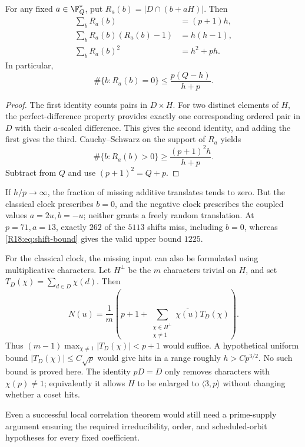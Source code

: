 \documentclass[11pt,a4paper]{article}
\theoremstyle{definition}\newtheorem{definition}[theorem]{Definition}
\theoremstyle{remark}\newtheorem{remark}[theorem]{Remark}
\begin{document}
\begin{proposition}\label{R18:prop:shifts}
For any fixed $a\in\F_Q^*$, put $R_a(b)=|D\cap(b+aH)|$.
Then
\begin{align*}
 \sum_bR_a(b)&=(p+1)h,\\
 \sum_bR_a(b)(R_a(b)-1)&=h(h-1),\\
 \sum_bR_a(b)^2&=h^2+ph.
\end{align*}
In particular,
\begin{equation}\label{R18:eq:shift-bound}
 \#\{b:R_a(b)=0\}\le\frac{p(Q-h)}{h+p}.
\end{equation}
\end{proposition}
\begin{proof}
The first identity counts pairs in $D\times H$.
For two distinct elements of $H$, the perfect-difference property
provides exactly one corresponding ordered pair in $D$ with their
$a$-scaled difference. This gives the second identity, and adding
the first gives the third. Cauchy--Schwarz on the support of $R_a$
yields
\[
 \#\{b:R_a(b)>0\}\ge\frac{(p+1)^2h}{h+p}.
\]
Subtract from $Q$ and use $(p+1)^2=Q+p$.
\end{proof}

If $h/p\to\infty$, the fraction of missing additive translates tends
to zero. But the classical clock prescribes $b=0$, and the negative
clock prescribes the coupled values $a=2u,b=-u$; neither grants a
freely random translation. At $p=71,a=13$, exactly $262$ of the
$5113$ shifts miss, including $b=0$, whereas
\eqref{R18:eq:shift-bound} gives the valid upper bound $1225$.

For the classical clock, the missing input can also be formulated
using multiplicative characters. Let $H^\perp$ be the $m$ characters
trivial on $H$, and set $T_D(\chi)=\sum_{d\in D}\chi(d)$. Then
\[
 N(u)=\frac1m\left(p+1+
 \sum_{\substack{\chi\in H^\perp\\\chi\ne1}}
 \overline{\chi(u)}T_D(\chi)\right).
\]
Thus $(m-1)\max_{\chi\ne1}|T_D(\chi)|<p+1$ would suffice.
A hypothetical uniform bound $|T_D(\chi)|\le C\sqrt p$ would
give hits in a range roughly $h>Cp^{3/2}$. No such bound is
proved here. The identity $pD=D$ only removes characters with
$\chi(p)\ne1$; equivalently it allows $H$ to be enlarged to
$\langle3,p\rangle$ without changing whether a coset hits.

Even a successful local correlation theorem would still need a
prime-supply argument ensuring the required irreducibility, order,
and scheduled-orbit hypotheses for every fixed coefficient.
\end{document}
